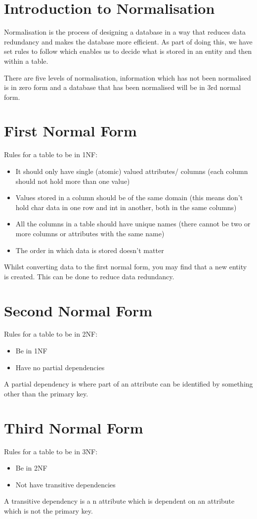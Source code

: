 
\section*{Introduction to Normalisation}
Normalisation is the process of designing a database in a way that reduces data redundancy and makes the database more efficient. As part of doing this, we have set rules to follow which enables us to decide what is stored in an entity and then within a table.

There are five levels of normalisation, information which has not been normalised is in zero form and a database that has been normalised will be in 3rd normal form. 

\section*{First Normal Form}
Rules for a table to be in 1NF:
\begin{itemize}
    \item It should only have single (atomic) valued attributes/ columns (each column should not hold more than one value)
    \item Values stored in a column should be of the same domain (this means don't hold char data in one row and int in another, both in the same columns)
    \item All the columns in a table should have unique names (there cannot be two or more columns or attributes with the same name)
    \item The order in which data is stored doesn't matter
\end{itemize}
Whilst converting data to the first normal form, you may find that a new entity is created. This can be done to reduce data redundancy. 

\section*{Second Normal Form}
Rules for a table to be in 2NF:
\begin{itemize}
    \item Be in 1NF
    \item Have no partial dependencies
\end{itemize}
A partial dependency is where part of an attribute can be identified by something other than the primary key.

\section*{Third Normal Form}
Rules for a table to be in 3NF:
\begin{itemize}
    \item Be in 2NF
    \item Not have transitive dependencies
\end{itemize}
A transitive dependency is a n attribute which is dependent on an attribute which is not the primary key.